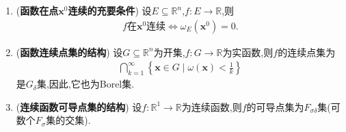 \documentclass[../../main.tex]{subfiles}%
\begin{document}
\begin{proposition}\label{proposition:实变函数连续点和导数点的结构}
\begin{enumerate}[(1)]
\item\label{proposition:实变函数连续点和导数点的结构-1} (\textbf{函数在点$\boldsymbol{x}^0$连续的充要条件}) 设$E\subseteq\mathbb{R}^n$,$f:E\to\mathbb{R}$,则
\begin{align*}
f\text{在}\boldsymbol{x}^0\text{连续}\iff \omega_E(\boldsymbol{x}^0)=0.
\end{align*}

\item\label{proposition:实变函数连续点和导数点的结构-2} (\textbf{函数连续点集的结构}) 设$G\subseteq\mathbb{R}^n$为开集,$f:G\to\mathbb{R}$为实函数,则$f$的连续点集为
\begin{align*}
\bigcap\limits_{k=1}^{\infty}\left\{\boldsymbol{x}\in G\mid \omega(\boldsymbol{x})<\frac{1}{k}\right\}
\end{align*}
是$G_{\delta}$集,因此,它也为Borel集.

\item\label{proposition:实变函数连续点和导数点的结构-3} (\textbf{连续函数可导点集的结构}) 设$f:\mathbb{R}^1\to\mathbb{R}$为连续函数,则$f$的可导点集为$F_{\sigma\delta}$集(可数个$F_{\sigma}$集的交集).
\end{enumerate}
\end{proposition}
\end{document}
